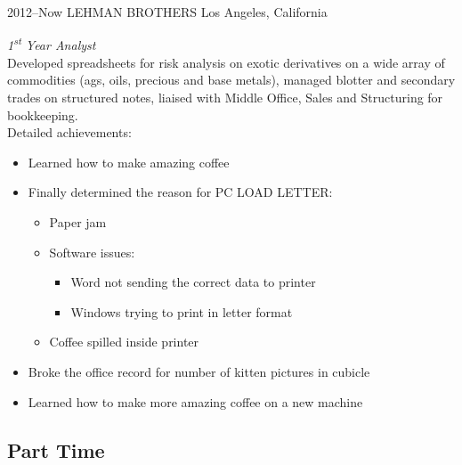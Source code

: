 \documentclass[print]{template/friggeri-cv} %
\begin{document}
\begin{entrylist}


\entry
{2012--Now}
{LEHMAN BROTHERS}
{Los Angeles, California}
{\emph{1\textsuperscript{st} Year Analyst} \\
Developed spreadsheets for risk analysis on exotic derivatives on a wide array of commodities (ags, oils, precious and base metals), managed blotter and secondary trades on structured notes, liaised with Middle Office, Sales and Structuring for bookkeeping. \\
Detailed achievements:
\begin{itemize}
\item Learned how to make amazing coffee
\item Finally determined the reason for \textsc{PC LOAD LETTER}:
\begin{itemize}
\item Paper jam
\item Software issues:
\begin{itemize}
\item Word not sending the correct data to printer
\item Windows trying to print in letter format
\end{itemize}
\item Coffee spilled inside printer
\end{itemize}
\item Broke the office record for number of kitten pictures in cubicle
\item Learned how to make more amazing coffee on a new machine
\end{itemize}}


\end{entrylist}

\subsection{Part Time}

\newpage
\end{document}
